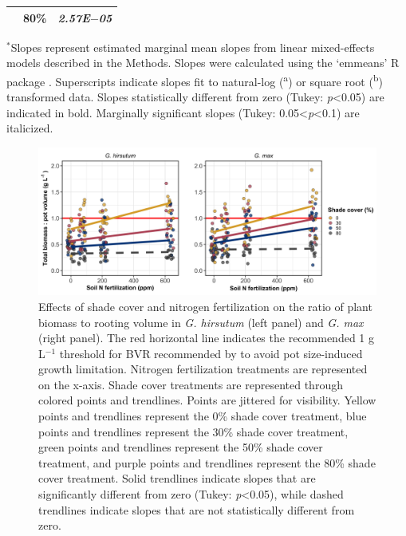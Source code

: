 \begin{landscape}
\begin{table}
\begin{tabular}{p{0.5cm}p{2cm}p{3cm}}
            & \multicolumn{1}{r}{80\%}
            &  \multicolumn{1}{r}{\textit{2.57E$-$05}} 
            \\
            \hline
        \end{tabular}%
        \label{tab:tablec.3}
    \end{table}
    \begin{singlespace}
        \noindent $^*$Slopes represent estimated marginal mean slopes from linear mixed-effects models described in the Methods. Slopes were calculated using the `emmeans’ R package . Superscripts indicate slopes fit to natural-log (\textsuperscript{a}) or square root (\textsuperscript{b}) transformed data. Slopes statistically different from zero (Tukey: \textit{p}<0.05) are indicated in bold. Marginally significant slopes (Tukey: 0.05<\textit{p}<0.1) are italicized.
    \end{singlespace}
\end{landscape}
\clearpage

\newpage
\begin{landscape}
\begin{figure}
    \centering
    \includegraphics[scale = 0.061]{ch2_LxN_Greenhouse/figs/figs1_bvr.png}
    \caption[Effects of shade cover and nitrogen fertilization on the ratio of plant biomass to rooting volume in \textit{G. hirsutum} and \textit{G. max}.]{Effects of shade cover and nitrogen fertilization on the ratio of plant biomass to rooting volume in \textit{G. hirsutum} (left panel) and \textit{G. max} (right panel). The red horizontal line indicates the recommended 1 g L$^{-1}$ threshold for BVR recommended by  to avoid pot size-induced growth limitation. Nitrogen fertilization treatments are represented on the x-axis. Shade cover treatments are represented through colored points and trendlines. Points are jittered for visibility.  Yellow points and trendlines represent the 0\% shade cover treatment, blue points and trendlines represent the 30\% shade cover treatment, green points and trendlines represent the 50\% shade cover treatment, and purple points and trendlines represent the 80\% shade cover treatment. Solid trendlines indicate slopes that are significantly different from zero (Tukey: \textit{p}<0.05), while dashed trendlines indicate slopes that are not statistically different from zero.}
    \label{fig:figure.a1}
\end{figure}
\end{landscape}
\clearpage